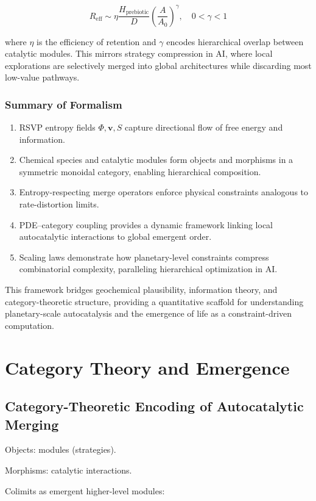 \documentclass{book}
\begin{document}
\[R_{\text{eff}} \sim \eta \frac{H_{\text{prebiotic}}}{D} \left( \frac{A}{A_0} \right)^\gamma, \quad 0 < \gamma < 1\]

where $\eta$ is the efficiency of retention and $\gamma$ encodes hierarchical overlap between catalytic modules. This mirrors strategy compression in AI, where local explorations are selectively merged into global architectures while discarding most low-value pathways.

\section{Summary of Formalism}
\begin{enumerate}
\item RSVP entropy fields $\Phi, \mathbf{v}, S$ capture directional flow of free energy and information.
\item Chemical species and catalytic modules form objects and morphisms in a symmetric monoidal category, enabling hierarchical composition.
\item Entropy-respecting merge operators enforce physical constraints analogous to rate-distortion limits.
\item PDE–category coupling provides a dynamic framework linking local autocatalytic interactions to global emergent order.
\item Scaling laws demonstrate how planetary-level constraints compress combinatorial complexity, paralleling hierarchical optimization in AI.
\end{enumerate}

This framework bridges geochemical plausibility, information theory, and category-theoretic structure, providing a quantitative scaffold for understanding planetary-scale autocatalysis and the emergence of life as a constraint-driven computation.

\part{Category Theory and Emergence}

\chapter{Category-Theoretic Encoding of Autocatalytic Merging}
Objects: modules (strategies).

Morphisms: catalytic interactions.

Colimits as emergent higher-level modules:
\end{document}
